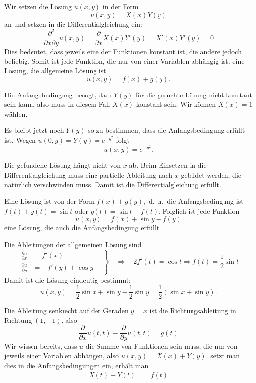 \begin{loesung}
\begin{teilaufgaben}
\item
Wir setzen die Lösung $u(x,y)$ in der Form
\[
u(x,y)=X(x)Y(y)
\]
an und setzen in die Differentialgleichung ein:
\[
\frac{\partial^2}{\partial x\partial y}u(x,y)
=
\frac{\partial}{\partial x}X(x)Y'(y)
=
X'(x)Y'(y)=0
\]
Dies bedeutet, dass jeweils eine der Funktionen
konstant ist, die andere jedoch beliebig.
Somit ist jede Funktion, die nur von einer Variablen
abhängig ist, eine Lösung, die allgemeine Lösung
ist
\[
u(x,y)=f(x)+g(y).
\]
\item
Die Anfangsbedingung besagt, dass $Y(y)$ für die gesuchte
Lösung nicht konstant sein kann, also muss in diesem Fall
$X(x)$ konstant sein. Wir können $X(x)=1$ wählen.

Es bleibt jetzt noch $Y(y)$ so zu bestimmen, dass die Anfangsbedingung
erfüllt ist. Wegen $u(0,y)=Y(y)=e^{-y^2}$ folgt
\[
u(x,y)=e^{-y^2}.
\]
\item
Die gefundene Lösung hängt nicht von $x$ ab. Beim Einsetzen
in die Differentialgleichung muss eine partielle Ableitung nach
$x$ gebildet werden, die natürlich verschwinden muss. Damit ist
die Differentialgleichung erfüllt.
\item
Eine Lösung ist von der Form
$f(x)+g(y),$
d.~h.~die Anfangsbedingung ist $f(t)+g(t)=\sin t$ oder $g(t)=\sin t-f(t)$.
Folglich ist jede Funktion
\[
u(x,y)=f(x)+\sin y-f(y)
\]
eine Lösung, die auch die Anfangsbedingung erfüllt.
\item
Die Ableitungen der allgemeinen Lösung sind
\[
\left.
\begin{aligned}
\frac{\partial u}{\partial x}
&=
f'(x)
\\
\frac{\partial u}{\partial y}
&=
-f'(y)+\cos y
\end{aligned}
\quad
\right\}
\quad
\Rightarrow
\quad
2f'(t)=\cos t
\Rightarrow f(t)=\frac12\sin t
\]
Damit ist die Lösung eindeutig bestimmt:
\[
u(x,y)=\frac12\sin x+\sin y-\frac12\sin y=\frac12(\sin x+\sin y).
\]
\item
Die Ableitung senkrecht auf der Geraden $y=x$ ist die Richtungsableitung
in Richtung $(1,-1)$, also
\[
\frac{\partial}{\partial x}u(t,t)-\frac{\partial}{\partial y}u(t,t)=g(t)
\]
Wir wissen bereits, dass $u$ die Summe von Funktionen sein muss, die
nur von jeweils einer Variablen abhängen, also
$u(x,y)=X(x)+Y(y)$. setzt man dies in die Anfangsbedingungen
ein, erhält man
\begin{align*}
X(t)+Y(t)&=f(t)\\

\end{align*}
\end{teilaufgaben}
\end{loesung}
